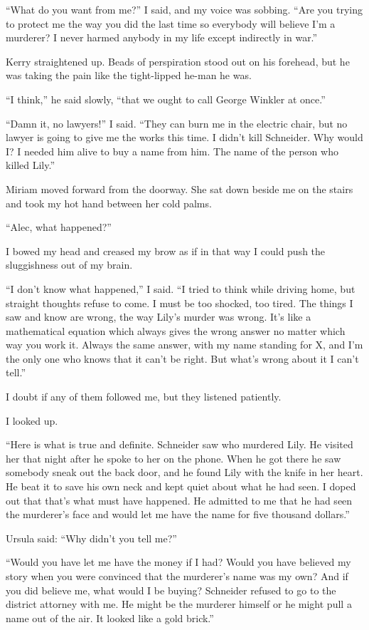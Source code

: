 \documentclass{novel}
\begin{document}
“What do you want from me?” I said, and my voice was sobbing. “Are you trying to protect me the way you did the last time so everybody will believe I’m a murderer? I never harmed anybody in my life except indirectly in war.”

Kerry straightened up. Beads of perspiration stood out on his forehead, but he was taking the pain like the tight-lipped he-man he was.

“I think,” he said slowly, “that we ought to call George Winkler at once.”

“Damn it, no lawyers!” I said. “They can burn me in the electric chair, but no lawyer is going to give me the works this time. I didn’t kill Schneider. Why would I? I needed him alive to buy a name from him. The name of the person who killed Lily.”

Miriam moved forward from the doorway. She sat down beside me on the stairs and took my hot hand between her cold palms. 

“Alec, what happened?”

I bowed my head and creased my brow as if in that way I could push the sluggishness out of my brain.

“I don’t know what happened,” I said. “I tried to think while driving home, but straight thoughts refuse to come. I must be too shocked, too tired. The things I saw and know are wrong, the way Lily’s murder was wrong. It’s like a mathematical equation which always gives the wrong answer no matter which way you work it. Always the same answer, with my name standing for X, and I’m the only one who knows that it can’t be right. But what’s wrong about it I can’t tell.”

I doubt if any of them followed me, but they listened patiently.

I looked up. 

“Here is what is true and definite. Schneider saw who murdered Lily. He visited her that night after he spoke to her on the phone. When he got there he saw somebody sneak out the back door, and he found Lily with the knife in her heart. He beat it to save his own neck and kept quiet about what he had seen. I doped out that that’s what must have happened. He admitted to me that he had seen the murderer’s face and would let me have the name for five thousand dollars.”

Ursula said: “Why didn’t you tell me?”

“Would you have let me have the money if I had? Would you have believed my story when you were convinced that the murderer’s name was my own? And if you did believe me, what would I be buying? Schneider refused to go to the district attorney with me. He might be the murderer himself or he might pull a name out of the air. It looked like a gold brick.”
\end{document}

